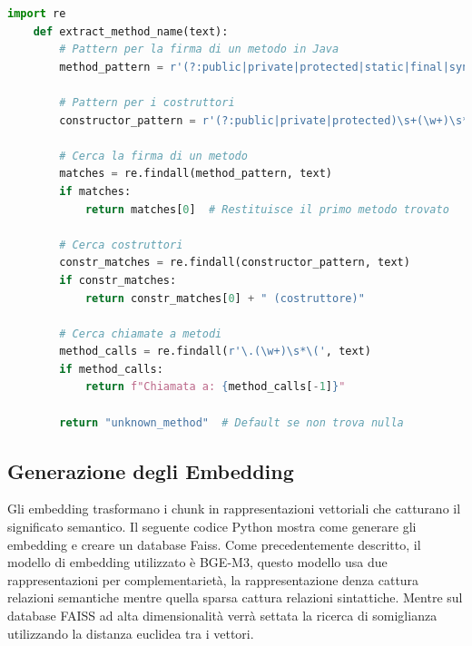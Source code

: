 \documentclass[12pt,a4paper,openright,twoside]{book}
\begin{document}
    \begin{lstlisting}[language=Python, caption={Funzione extract\_method\_name}]
    import re
    def extract_method_name(text):
        # Pattern per la firma di un metodo in Java
        method_pattern = r'(?:public|private|protected|static|final|synchronized|abstract|native)\s+[\w<>\[\]]+\s+(\w+)\s*\([^)]*\)'
        
        # Pattern per i costruttori
        constructor_pattern = r'(?:public|private|protected)\s+(\w+)\s*\([^)]*\)'
        
        # Cerca la firma di un metodo
        matches = re.findall(method_pattern, text)
        if matches:
            return matches[0]  # Restituisce il primo metodo trovato
        
        # Cerca costruttori
        constr_matches = re.findall(constructor_pattern, text)
        if constr_matches:
            return constr_matches[0] + " (costruttore)"
        
        # Cerca chiamate a metodi
        method_calls = re.findall(r'\.(\w+)\s*\(', text)
        if method_calls:
            return f"Chiamata a: {method_calls[-1]}"
        
        return "unknown_method"  # Default se non trova nulla
    \end{lstlisting}
        
\subsection{Generazione degli Embedding}
    Gli embedding trasformano i chunk in rappresentazioni vettoriali che catturano il significato semantico.
    Il seguente codice Python mostra come generare gli embedding e creare un database Faiss.
    Come precedentemente descritto, il modello di embedding utilizzato è BGE-M3, questo modello usa due rappresentazioni per complementarietà, la rappresentazione denza cattura relazioni semantiche mentre quella sparsa cattura relazioni sintattiche.
    Mentre sul database FAISS ad alta dimensionalità verrà settata la ricerca di somiglianza utilizzando la distanza euclidea tra i vettori.
    
\end{document}
